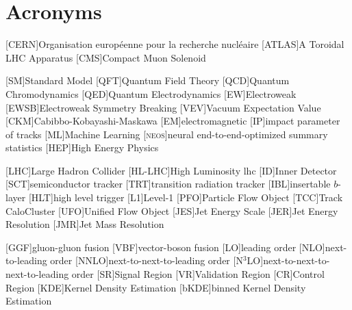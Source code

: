 
\chapter{Acronyms}
\begin{acronym}[neos]
    [CERN]{Organisation européenne pour la recherche nucléaire}
    [ATLAS]{A Toroidal LHC Apparatus}
    [CMS]{Compact Muon Solenoid}

    [SM]{Standard Model}
    [QFT]{Quantum Field Theory}
    [QCD]{Quantum Chromodynamics}
    [QED]{Quantum Electrodynamics}
    [EW]{Electroweak}
    [EWSB]{Electroweak Symmetry Breaking}
    [VEV]{Vacuum Expectation Value}
    [CKM]{Cabibbo-Kobayashi-Maskawa}
    [EM]{electromagnetic}
    [IP]{impact parameter of tracks}
    [ML]{Machine Learning}
    [\textsc{neos}]{neural end-to-end-optimized summary statistics}
    [HEP]{High Energy Physics}



    [LHC]{Large Hadron Collider}
    [HL-LHC]{High Luminosity \acs{lhc}}
    [ID]{Inner Detector}
    [SCT]{semiconductor tracker}
    [TRT]{transition radiation tracker}
    [IBL]{insertable $b$-layer}
    [HLT]{high level trigger}
    [L1]{Level-1}
    [PFO]{Particle Flow Object}
    [TCC]{Track CaloCluster}
    [UFO]{Unified Flow Object}
    [JES]{Jet Energy Scale}
    [JER]{Jet Energy Resolution}
    [JMR]{Jet Mass Resolution}


    [GGF]{gluon-gluon fusion}
    [VBF]{vector-boson fusion}
    [LO]{leading order}
    [NLO]{next-to-leading order}
    [NNLO]{next-to-next-to-leading order}
    [N$^3$LO]{next-to-next-to-next-to-leading order}
    [SR]{Signal Region}
    [VR]{Validation Region}
    [CR]{Control Region}
    [KDE]{Kernel Density Estimation}
    [bKDE]{binned Kernel Density Estimation}


\end{acronym}
